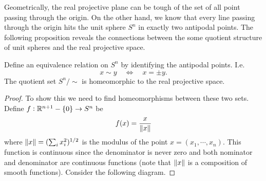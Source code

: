 Geometrically, the real projective plane can be tough of the set of all point passing through the origin. On the other hand, we know that every line passing through the origin hits the unit sphere $ S^n $ in exactly two antipodal points. The following proposition reveals the connections between the some quotient structure of unit spheres and the real projective space. 

\begin{proposition}
	Define an equivalence relation on $ S^n $ by identifying the antipodal points. I.e. 
	\[ x \sim y \quad \Longleftrightarrow \quad x = \pm y. \]
	The quotient set $ S^n/\sim $ is homeomorphic to the real projective space.
\end{proposition}
\begin{proof}
	To show this we need to find homeomorphisms between these two sets. Define $ f: \mathbb{R}^{n+1}-\{0\} \to S^n$ be
	\[ f(x) = \frac{x}{\norm{x}} \]
	where $ \norm{x} = (\sum_{i}x_i^2)^{1/2} $ is the modulus of the point $ x=(x_1,\cdots,x_n) $. This function is continuous since the denominator is never zero and both nominator and denominator are continuous functions (note that $ \norm{x} $ is a composition of smooth functions). Consider the following diagram. 


\end{proof}
